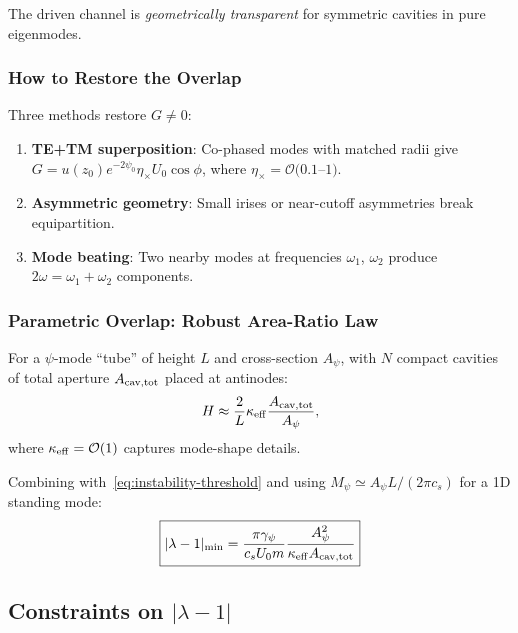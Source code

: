 The driven channel is \textit{geometrically transparent} for symmetric 
cavities in pure eigenmodes.

\subsubsection{How to Restore the Overlap}

Three methods restore $G \neq 0$:
\begin{enumerate}
\item \textbf{TE+TM superposition}: Co-phased modes with matched radii give 
$G = u(z_0)e^{-2\psi_0}\eta_\times U_0\cos\phi$, where $\eta_\times = \mathcal{O}(0.1$--$1)$.

\item \textbf{Asymmetric geometry}: Small irises or near-cutoff asymmetries 
break equipartition.

\item \textbf{Mode beating}: Two nearby modes at frequencies $\omega_1$, 
$\omega_2$ produce $2\omega = \omega_1 + \omega_2$ components.
\end{enumerate}

\subsubsection{Parametric Overlap: Robust Area-Ratio Law}

For a $\psi$-mode ``tube'' of height $L$ and cross-section $A_\psi$, with 
$N$ compact cavities of total aperture $A_{\rm cav,tot}$ placed at antinodes:
\begin{equation}
H \approx \frac{2}{L}\kappa_{\rm eff}\frac{A_{\rm cav,tot}}{A_\psi},
\label{eq:area-ratio-law}
\end{equation}
where $\kappa_{\rm eff} = \mathcal{O}(1)$ captures mode-shape details.

Combining with~\eqref{eq:instability-threshold} and using 
$M_\psi \simeq A_\psi L/(2\pi c_s)$ for a 1D standing mode:
\begin{equation}
\boxed{
|\lambda - 1|_{\rm min} = \frac{\pi\gamma_\psi}{c_s U_0 m}\frac{A_\psi^2}{\kappa_{\rm eff}A_{\rm cav,tot}}
}
\label{eq:design-law}
\end{equation}

\subsection{Constraints on $|\lambda - 1|$}\label{sec:lambda-bounds}

